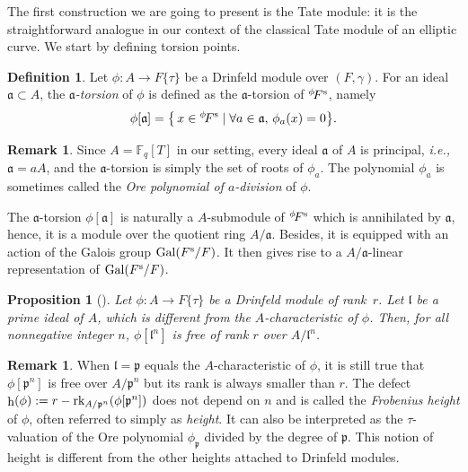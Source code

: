 \documentclass[11pt]{article}
\newtheorem{proposition}[theorem]{Proposition}
\theoremstyle{definition}
\newtheorem{definition}[theorem]{Definition}
\newtheorem{remark}[theorem]{Remark}
\newcommand\Fq{\mathbb{F}_q}
\newcommand\rk{\text{\rm rk}}
\newcommand{\p}{\mathfrak{p}}
\newcommand{\Fs}{F^{\text{\rm s}}}
\newcommand{\Gal}{\text{\rm Gal}}
\newcommand{\phiact}[1]{{}^\phi\! #1}
\newcommand{\ie}{\textit{i.e.,~}}
\DeclareMathOperator{\h}{h}
\begin{document}
The first construction we are going to present is the Tate module: it is the straightforward analogue in our context of the classical Tate module of an elliptic curve.
We start by defining torsion points.

\begin{definition}
\label{def:torsion}
Let $\phi: A \to F\{\tau\}$ be a Drinfeld module over $(F, \gamma)$.
For an ideal $\mathfrak a \subset A$, the \emph{$\mathfrak a$-torsion} of $\phi$ is defined 
as the $\mathfrak{a}$-torsion of $\phiact\Fs$, namely
\[
    \phi[\mathfrak a] = \big\{ \, x \in \phiact\Fs \mid \forall a \in \mathfrak a , \,
              \phi_a(x) = 0 \big\}.
\]
\end{definition}

\begin{remark}
Since $A = \Fq[T]$ in our setting, every ideal $\mathfrak a$ of $A$ is principal, 
\ie $\mathfrak a = aA$, and the $\mathfrak a$-torsion is simply the set of roots of $\phi_a$.
The polynomial $\phi_a$ is sometimes called the \emph{Ore polynomial of $a$-division} of $\phi$.
\end{remark}

The $\mathfrak a$-torsion $\phi[\mathfrak a]$ is naturally a 
$A$-submodule of $\phiact\Fs$ which is annihilated by $\mathfrak a$, hence, it is a module over
the quotient ring $A/\mathfrak a$. Besides, it is equipped with an action
of the Galois group $\Gal(\Fs/F)$. It then gives rise to a $A/\mathfrak a$-linear
representation of $\Gal(\Fs/F)$.

\begin{proposition}[]
\label{prop:torsion}
Let $\phi: A \to F\{\tau\}$ be a Drinfeld module of rank~$r$.
Let $\mathfrak l$ be a prime ideal of $A$, which is different from the $A$-characteristic of $\phi$.
Then, for all nonnegative integer $n$, $\phi[\mathfrak{l}^n]$ is free of rank $r$ over
$A/\mathfrak l^n$.
\end{proposition}

\begin{remark}\label{rk:height}
When $\mathfrak l = \mathfrak p$ equals the $A$-characteristic of $\phi$,
it is still true that $\phi[\mathfrak{p}^n]$ is free over $A/\mathfrak p^n$ but its rank is always smaller than $r$.
The defect $\h(\phi) := r - \rk_{A/\mathfrak p^n}(\phi[\mathfrak{p}^n])$ does
not depend on $n$ and is called the \emph{Frobenius height} of $\phi$,
often referred to simply as \emph{height}.
It can also be interpreted as the $\tau$-valuation of the Ore polynomial 
$\phi_{\mathfrak p}$ divided by the degree of $\p$. This notion of height is different from the other heights attached to Drinfeld modules.
\end{remark}
\end{document}
